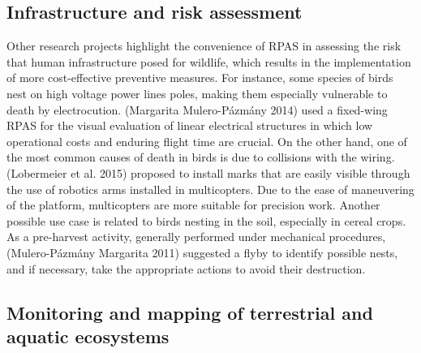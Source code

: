 \documentclass[]{interact}
\theoremstyle{plain}%
\theoremstyle{definition}
\theoremstyle{remark}
\begin{document}


\subsection{Infrastructure and risk
assessment}\label{infrastructure-and-risk-assessment}

Other research projects highlight the convenience of RPAS in assessing
the risk that human infrastructure posed for wildlife, which results in
the implementation of more cost-effective preventive measures. For
instance, some species of birds nest on high voltage power lines poles,
making them especially vulnerable to death by electrocution. (Margarita
Mulero-Pázmány 2014) used a fixed-wing RPAS for the visual evaluation of
linear electrical structures in which low operational costs and enduring
flight time are crucial. On the other hand, one of the most common
causes of death in birds is due to collisions with the wiring.
(Lobermeier et al. 2015) proposed to install marks that are easily
visible through the use of robotics arms installed in multicopters. Due
to the ease of maneuvering of the platform, multicopters are more
suitable for precision work. Another possible use case is related to
birds nesting in the soil, especially in cereal crops. As a pre-harvest
activity, generally performed under mechanical procedures,
(Mulero-Pázmány Margarita 2011) suggested a flyby to identify possible
nests, and if necessary, take the appropriate actions to avoid their
destruction.

\subsection{Monitoring and mapping of terrestrial and aquatic
ecosystems}\label{monitoring-and-mapping-of-terrestrial-and-aquatic-ecosystems}
\end{document}
